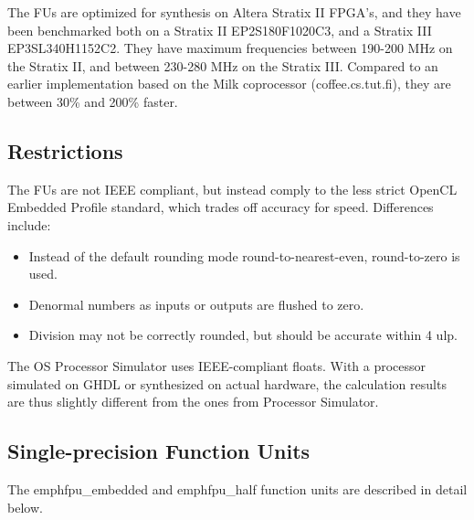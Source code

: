 \documentclass[a4paper,twoside]{tceusermanual}
\begin{document}
The FUs are optimized for synthesis on Altera Stratix II FPGA's, and they have been 
benchmarked both on a Stratix II EP2S180F1020C3, and a Stratix III 
EP3SL340H1152C2. They have maximum frequencies between 190-200 MHz on the 
Stratix II, and between 230-280 MHz on the Stratix III. 
Compared to an earlier implementation based on the Milk coprocessor 
(coffee.cs.tut.fi), they are between 30\% and 200\% faster.

\subsection{Restrictions}

The FUs are not IEEE compliant, but instead comply to the less strict OpenCL 
Embedded Profile standard, which trades off accuracy for speed. Differences include:

\begin{itemize}
    \item Instead of the default rounding mode round-to-nearest-even, round-to-zero is used.
    \item Denormal numbers as inputs or outputs are flushed to zero.
    \item Division may not be correctly rounded, but should be accurate within 4 ulp.
\end{itemize}

The OS Processor Simulator uses IEEE-compliant floats. With a processor simulated on GHDL or 
synthesized on actual hardware, the calculation results are thus slightly different from the 
ones from Processor Simulator.

\subsection{Single-precision Function Units}

The emph{fpu\_embedded} and emph{fpu\_half} function units are described in detail below.
\end{document}
